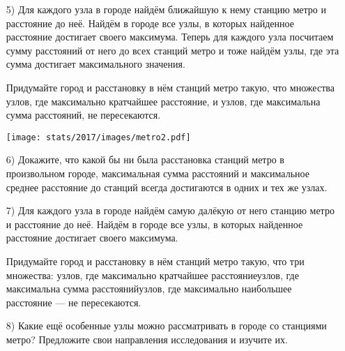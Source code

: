 \begin{enumerate}

\item [5)] Для каждого узла в городе найдём ближайшую к нему станцию метро и расстояние до неё. Найдём в городе все узлы, в которых найденное расстояние достигает своего максимума. Теперь для каждого узла посчитаем сумму расстояний от него до всех станций метро и тоже найдём узлы, где эта сумма достигает максимального значения.

\smallskip\noindent Придумайте город и расстановку в нём станций метро такую, что множества узлов, где максимально кратчайшее расстояние, и узлов, где максимальна сумма расстояний, не пересекаются.

\vspace{-0.3cm}
\begin{center}
\texttt{[image: stats/2017/images/metro2.pdf]}
\end{center} \vspace{-0.7cm}

\item[6)] Докажите, что какой бы ни была расстановка станций метро в произвольном городе, максимальная сумма расстояний и максимальное среднее расстояние до станций всегда достигаются в одних и тех же узлах.

\item[7)] Для каждого узла в городе найдём самую далёкую от него станцию метро и расстояние до неё. Найдём в городе все узлы, в которых найденное расстояние достигает своего максимума.

\smallskip\noindent Придумайте город и расстановку в нём станций метро такую, что три множества: узлов, где максимально кратчайшее расстояние\scolon узлов, где максимальна сумма расстояний\scolon узлов, где максимально наибольшее расстояние — не пересекаются.

\item[8)] Какие ещё особенные узлы можно рассматривать в городе со станциями метро?  Предложите свои направления исследования и изучите их.

\end{enumerate}